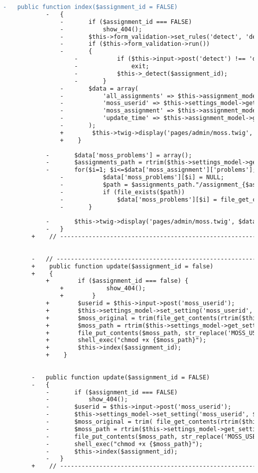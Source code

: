 \begin{lstlisting}[language=diff, caption=Perubahan pada kode Moss.php]
			-	public function index($assignment_id = FALSE)
			-	{
				-		if ($assignment_id === FALSE)
				-			show_404();
				-		$this->form_validation->set_rules('detect', 'detect', 'required');
				-		if ($this->form_validation->run())
				-		{
					-			if ($this->input->post('detect') !== 'detect')
					-				exit;
					-			$this->_detect($assignment_id);
					-		}
				-		$data = array(
				-			'all_assignments' => $this->assignment_model->all_assignments(),
				-			'moss_userid' => $this->settings_model->get_setting('moss_userid'),
				-			'moss_assignment' => $this->assignment_model->assignment_info($assignment_id),
				-			'update_time' => $this->assignment_model->get_moss_time($assignment_id)
				-		);
				+        $this->twig->display('pages/admin/moss.twig', $data);
				+    }
			
			-		$data['moss_problems'] = array();
			-		$assignments_path = rtrim($this->settings_model->get_setting('assignments_root'), '/');
			-		for($i=1; $i<=$data['moss_assignment']['problems']; $i++){
				-			$data['moss_problems'][$i] = NULL;
				-			$path = $assignments_path."/assignment_{$assignment_id}/p{$i}/moss_link.txt";
				-			if (file_exists($path))
				-				$data['moss_problems'][$i] = file_get_contents($path);
				-		}
			
			-		$this->twig->display('pages/admin/moss.twig', $data);
			-	}
		+    // ------------------------------------------------------------------------
		
		
		-	// ------------------------------------------------------------------------
		+    public function update($assignment_id = false)
		+    {
			+        if ($assignment_id === false) {
				+            show_404();
				+        }
			+        $userid = $this->input->post('moss_userid');
			+        $this->settings_model->set_setting('moss_userid', $userid);
			+        $moss_original = trim(file_get_contents(rtrim($this->settings_model->get_setting('tester_path'), '/').'/moss_original'));
			+        $moss_path = rtrim($this->settings_model->get_setting('tester_path'), '/').'/moss';
			+        file_put_contents($moss_path, str_replace('MOSS_USER_ID', $userid, $moss_original));
			+        shell_exec("chmod +x {$moss_path}");
			+        $this->index($assignment_id);
			+    }
		
		
		-	public function update($assignment_id = FALSE)
		-	{
			-		if ($assignment_id === FALSE)
			-			show_404();
			-		$userid = $this->input->post('moss_userid');
			-		$this->settings_model->set_setting('moss_userid', $userid);
			-		$moss_original = trim( file_get_contents(rtrim($this->settings_model->get_setting('tester_path'), '/').'/moss_original') );
			-		$moss_path = rtrim($this->settings_model->get_setting('tester_path'), '/').'/moss';
			-		file_put_contents($moss_path, str_replace('MOSS_USER_ID', $userid, $moss_original));
			-		shell_exec("chmod +x {$moss_path}");
			-		$this->index($assignment_id);
			-	}
		+    // ------------------------------------------------------------------------
		

\end{lstlisting}
